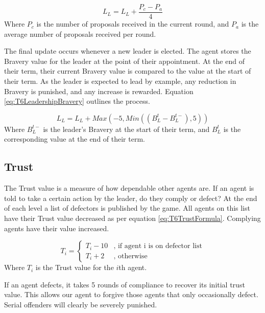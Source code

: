 \begin{equation}\label{eq:T6LeadershipFOIFormula}
    L_{L} = L_{L} + \frac{P_{c}-P_{a}}{4}
\end{equation}
Where $P_{c}$ is the number of proposals received in the current round, and $P_{a}$ is the average number of proposals received per round.

The final update occurs whenever a new leader is elected. The agent stores the Bravery value for the leader at the point of their appointment. At the end of their term, their current Bravery value is compared to the value at the start of their term. As the leader is expected to lead by example, any reduction in Bravery is punished, and any increase is rewarded. Equation \ref{eq:T6LeadershipBravery} outlines the process.

\begin{equation}\label{eq:T6LeadershipBravery}
    L_{L} = L_{L} + Max(-5,Min((B_{L}^{t}-B_{L}^{t-}),5))
\end{equation}
Where $B_{L}^{t-}$ is the leader's Bravery at the start of their term, and $B_{L}^{t}$ is the corresponding value at the end of their term.

\subsection{Trust}

The Trust value is a measure of how dependable other agents are. If an agent is told to take a certain action by the leader, do they comply or defect? At the end of each level a list of defectors is published by the game. All agents on this list have their Trust value decreased as per equation \ref{eq:T6TrustFormula}. Complying agents have their value increased.

\begin{equation}\label{eq:T6TrustFormula}
    T_{i}=\left\{
    	\begin{array}{ll}
    		T_{i}-10 & \mbox{, if agent i is on defector list} \\
    		T_{i}+2  & \mbox{, otherwise} 
    	\end{array}\right.
\end{equation}
Where $T_{i}$ is the Trust value for the $i$th agent.

If an agent defects, it takes 5 rounds of compliance to recover its initial trust value. This allows our agent to forgive those agents that only occasionally defect. Serial offenders will clearly be severely punished.

